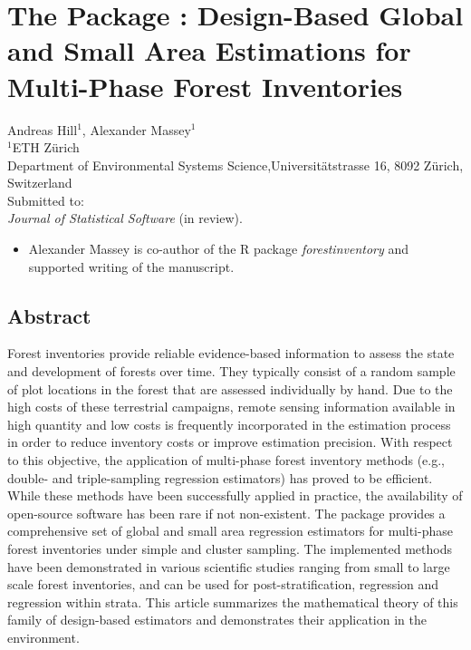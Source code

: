 \chapter{The  Package : Design-Based Global and Small Area Estimations for Multi-Phase Forest Inventories}
\label{chap:rpack}
{\large Andreas Hill$^1$, Alexander Massey$^1$}\\

\vspace{3cm}
\noindent
$^1$ETH Z\"urich\\Department of Environmental Systems Science,Universit\"atstrasse 16, 8092 Z\"urich, Switzerland \\

\vspace{\fill}
\noindent
Submitted to:\\
\textit{Journal of Statistical Software} (in review).

\newpage
\renewcommand{\labelitemi}{--}
\begin{itemize}
	\item Alexander Massey is co-author of the R package \textit{forestinventory} and supported writing of the manuscript.
\end{itemize}

\clearpage
\section*{Abstract}
\label{chap:rpack:Abstract}
Forest inventories provide reliable evidence-based information to assess the state and development of forests over time.  They typically consist of a random sample of plot locations in the forest that are assessed individually by hand. Due to the high costs of these terrestrial campaigns, remote sensing information available in high quantity and low costs is frequently incorporated in the estimation process in order to reduce inventory costs or improve estimation precision. With respect to this objective, the application of multi-phase forest inventory methods (e.g., double- and triple-sampling regression estimators) has proved to be efficient. While these methods have been successfully applied in practice, the availability of open-source software has been rare if not non-existent. The  package  provides a comprehensive set of global and small area regression estimators for multi-phase forest inventories under simple and cluster sampling. The implemented methods have been demonstrated in various scientific studies ranging from small to large scale forest inventories, and can be used for post-stratification, regression and regression within strata. This article summarizes the mathematical theory of this family of design-based estimators and demonstrates their application in the  environment.



